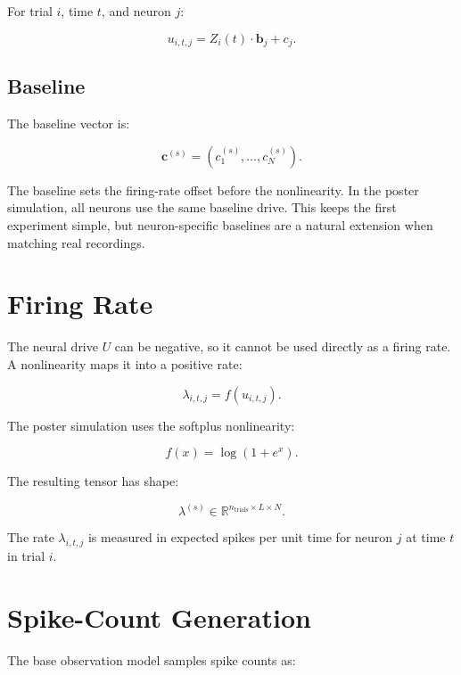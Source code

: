 \documentclass[11pt]{article}
\begin{document}
For trial $i$, time $t$, and neuron $j$:

\begin{equation}
u_{i,t,j} = Z_i(t) \cdot \bm{b}_j + c_j.
\end{equation}

\subsection{Baseline}

The baseline vector is:

\begin{equation}
\bm{c}^{(s)} = (c_1^{(s)},\dots,c_N^{(s)}).
\end{equation}

The baseline sets the firing-rate offset before the nonlinearity. In the
poster simulation, all neurons use the same baseline drive. This keeps the
first experiment simple, but neuron-specific baselines are a natural extension
when matching real recordings.

\section{Firing Rate}

The neural drive $U$ can be negative, so it cannot be used directly as a firing
rate. A nonlinearity maps it into a positive rate:

\begin{equation}
\lambda_{i,t,j} = f(u_{i,t,j}).
\end{equation}

The poster simulation uses the softplus nonlinearity:

\begin{equation}
f(x) = \log(1 + e^x).
\end{equation}

The resulting tensor has shape:

\begin{equation}
\lambda^{(s)} \in
\mathbb{R}^{n_{\text{trials}} \times L \times N}.
\end{equation}

The rate $\lambda_{i,t,j}$ is measured in expected spikes per unit time for
neuron $j$ at time $t$ in trial $i$.

\section{Spike-Count Generation}

The base observation model samples spike counts as:
\end{document}
